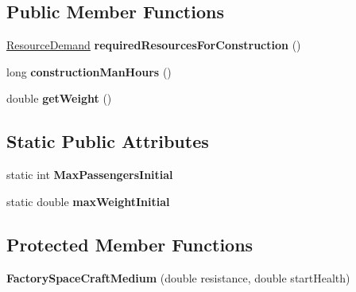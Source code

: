\subsection*{Public Member Functions}
\begin{DoxyCompactItemize}
\item 
\hyperlink{classuniverse_1_1_resource_demand}{Resource\+Demand} {\bfseries required\+Resources\+For\+Construction} ()\hypertarget{classtools_1_1vehicles_1_1space_1_1_factory_space_craft_medium_a5cfd5a8966ac7d1a4452cb5b789ffe9b}{}\label{classtools_1_1vehicles_1_1space_1_1_factory_space_craft_medium_a5cfd5a8966ac7d1a4452cb5b789ffe9b}

\item 
long {\bfseries construction\+Man\+Hours} ()\hypertarget{classtools_1_1vehicles_1_1space_1_1_factory_space_craft_medium_ab466f42e63714aa971b93d1c869fd4c6}{}\label{classtools_1_1vehicles_1_1space_1_1_factory_space_craft_medium_ab466f42e63714aa971b93d1c869fd4c6}

\item 
double {\bfseries get\+Weight} ()\hypertarget{classtools_1_1vehicles_1_1space_1_1_factory_space_craft_medium_aa879dd25868ac97a1877d417e531f39d}{}\label{classtools_1_1vehicles_1_1space_1_1_factory_space_craft_medium_aa879dd25868ac97a1877d417e531f39d}

\end{DoxyCompactItemize}
\subsection*{Static Public Attributes}
\begin{DoxyCompactItemize}
\item 
static int {\bfseries Max\+Passengers\+Initial}\hypertarget{classtools_1_1vehicles_1_1space_1_1_factory_space_craft_medium_ac579ee71ed0977c63a6e75505ed67603}{}\label{classtools_1_1vehicles_1_1space_1_1_factory_space_craft_medium_ac579ee71ed0977c63a6e75505ed67603}

\item 
static double {\bfseries max\+Weight\+Initial}\hypertarget{classtools_1_1vehicles_1_1space_1_1_factory_space_craft_medium_abeaa0614adbfa6c7d804644fef34070f}{}\label{classtools_1_1vehicles_1_1space_1_1_factory_space_craft_medium_abeaa0614adbfa6c7d804644fef34070f}

\end{DoxyCompactItemize}
\subsection*{Protected Member Functions}
\begin{DoxyCompactItemize}
\item 
{\bfseries Factory\+Space\+Craft\+Medium} (double resistance, double start\+Health)\hypertarget{classtools_1_1vehicles_1_1space_1_1_factory_space_craft_medium_a6f76ea2104f8990243aec962fc7877af}{}\label{classtools_1_1vehicles_1_1space_1_1_factory_space_craft_medium_a6f76ea2104f8990243aec962fc7877af}

\end{DoxyCompactItemize}
